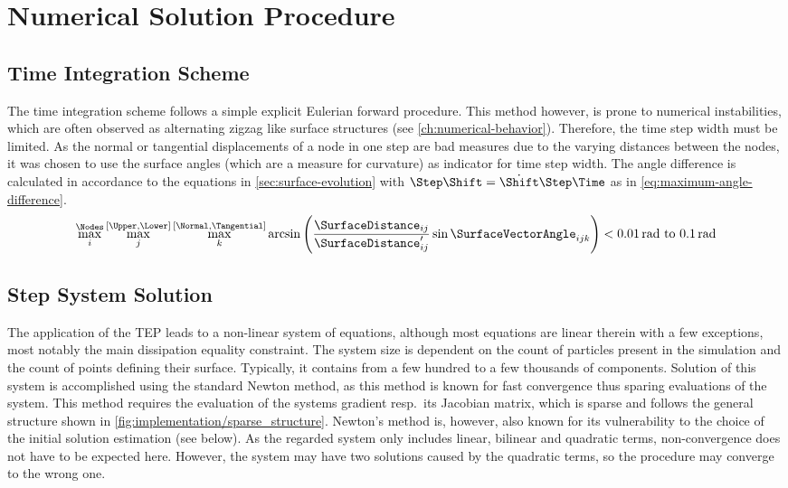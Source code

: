\section{Numerical Solution Procedure}\label{sec:solution}

\subsection{Time Integration Scheme}\label{subsec:time-integration-scheme}

The time integration scheme follows a simple explicit Eulerian forward procedure.
This method however, is prone to numerical instabilities, which are often observed as alternating zigzag like surface structures (see \cref{ch:numerical-behavior}).
Therefore, the time step width must be limited.
As the normal or tangential displacements of a node in one step are bad measures due to the varying distances between the nodes, it was chosen to use the surface angles (which are a measure for curvature) as indicator for time step width.
The angle difference is calculated in accordance to the equations in \cref{sec:surface-evolution} with $\Step\Shift = \dot\Shift \Step\Time$ as in \cref{eq:maximum-angle-difference}.
\begin{equation}
    \max_i^{\Nodes} \max_j^{[\Upper, \Lower]} \max_k^{[\Normal, \Tangential]} \arcsin \left( \frac{\SurfaceDistance_{ij}}{\SurfaceDistance'_{ij}} \sin \SurfaceVectorAngle_{ijk} \right)  < \qtyrange{0.01}{0.1}{\radian}
    \label{eq:maximum-angle-difference}
\end{equation}

\subsection{Step System Solution}\label{subsec:step-system-solution}

The application of the \gls{TEP} leads to a non-linear system of equations, although most equations are linear therein with a few exceptions, most notably the main dissipation equality constraint.
The system size is dependent on the count of particles present in the simulation and the count of points defining their surface.
Typically, it contains from a few hundred to a few thousands of components.
Solution of this system is accomplished using the standard Newton method, as this method is known for fast convergence thus sparing evaluations of the system.
This method requires the evaluation of the systems gradient resp.~its Jacobian matrix, which is sparse and follows the general structure shown in \cref{fig:implementation/sparse_structure}.
Newton's method is, however, also known for its vulnerability to the choice of the initial solution estimation (see below).
As the regarded system only includes linear, bilinear and quadratic terms, non-convergence does not have to be expected here.
However, the system may have two solutions caused by the quadratic terms, so the procedure may converge to the wrong one.

